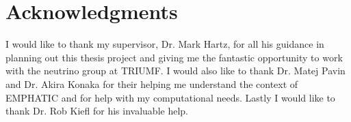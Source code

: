
\chapter{Acknowledgments}
I would like to thank my supervisor, Dr. Mark Hartz, for all his guidance in planning out this thesis project and giving me the fantastic opportunity to work with the neutrino group at TRIUMF.
I would also like to thank Dr. Matej Pavin and Dr. Akira Konaka for their helping me understand the context of \ac{EMPHATIC} and for help with my computational needs.
Lastly I would like to thank Dr. Rob Kiefl for his invaluable help.
